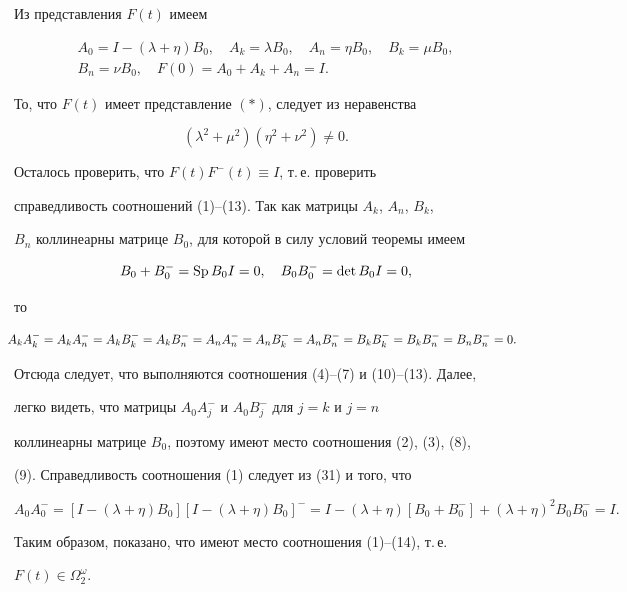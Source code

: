 \begin{pf} 


Из представления $F(t)$ имеем 


\begin{gather*} 


A_0=I-(\lambda+\eta)B_0,\quad A_k=\lambda B_0,\quad 


A_n=\eta B_0,\quad B_k=\mu B_0,\\ 


B_n=\nu B_0,\quad F(0)=A_0+A_k+A_n=I. 


\end{gather*} 


 


То, что $F(t)$ имеет представление $(\ast)$, следует из неравенства 


$$ 


(\lambda^2+\mu^2)(\eta^2+\nu^2)\ne0. 


$$ 


 


Осталось проверить, что $F(t)F^-(t)\equiv I$, т.\,е. проверить 


справедливость соотношений (1)--(13). Так как матрицы $A_k$, $A_n$, $B_k$, 


$B_n$ коллинеарны матрице $B_0$, для которой в силу условий теоремы имеем 


$$ 


B_0+B^-_0=\Sp B_0 I=0,\quad 


B_0 B^-_0=\det B_0I=0, 


$$ 


то 


\begin{equation} 


\hspace*{-2mm} A_k A^-_k=A_k A^-_n=A_k B^-_k=A_k B^-_n=A_n A^-_n= 


A_n B^-_k=A_n B^-_n=B_k B^-_k=B_k B^-_n=B_n B^-_n=0. 


\end{equation} 


Отсюда следует, что выполняются соотношения (4)--(7) и (10)--(13). Далее, 


легко видеть, что матрицы $A_0A^-_j$ и $A_0B^-_j$ для $j=k$ и $j=n$ 


коллинеарны матрице $B_0$, поэтому имеют место соотношения (2), (3), (8), 


(9). Справедливость соотношения (1) следует из (31) и того, что 


$$ 


A_0A^-_0=[I-(\lambda+\eta)B_0][I-(\lambda+\eta)B_0]^-= 


I-(\lambda+\eta)[B_0+B^-_0]+(\lambda+\eta)^2B_0B^-_0=I. 


$$ 


Таким образом, показано, что имеют место соотношения (1)--(14), т.\,е. 


$F(t)\in\Omega^\omega_2$. 


\end{pf}


